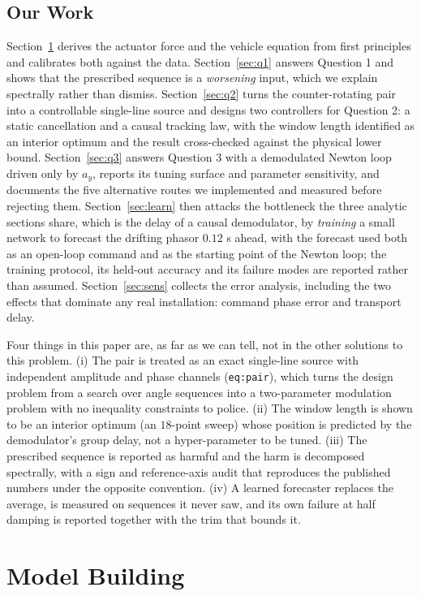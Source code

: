 \documentclass[12pt]{apmcmthesis}
\begin{document}
\subsection{Our Work}
Section~\ref{sec:model} derives the actuator force and the vehicle equation from first
principles and calibrates both against the data. Section~\ref{sec:q1} answers Question 1 and shows
that the prescribed sequence is a \emph{worsening} input, which we explain spectrally rather than
dismiss. Section~\ref{sec:q2} turns the counter-rotating pair into a controllable single-line
source and designs two controllers for Question 2: a static cancellation and a causal tracking
law, with the window length identified as an interior optimum and the result cross-checked against
the physical lower bound. Section~\ref{sec:q3} answers Question 3 with a demodulated Newton loop
driven only by $a_y$, reports its tuning surface and parameter sensitivity, and documents the
five alternative routes we implemented and measured before rejecting them.
Section~\ref{sec:learn} then attacks the bottleneck the three analytic sections share, which is the
delay of a causal demodulator, by \emph{training} a small network to forecast the drifting phasor
$0.12$ s ahead, with the forecast used both as an open-loop command and as the starting point of
the Newton loop; the training protocol, its held-out accuracy and its failure modes are reported
rather than assumed.
Section~\ref{sec:sens} collects the error analysis, including the two effects that dominate any
real installation: command phase error and transport delay.

Four things in this paper are, as far as we can tell, not in the other solutions to this problem.
(i) The pair is treated as an exact single-line source with independent amplitude and phase
channels (\texttt{eq:pair}), which turns the design problem from a search over angle sequences
into a two-parameter modulation problem with no inequality constraints to police.
(ii) The window length is shown to be an interior optimum (an $18$-point sweep) whose position is
predicted by the demodulator's group delay, not a hyper-parameter to be tuned.
(iii) The prescribed sequence is reported as harmful and the harm is decomposed spectrally, with a
sign and reference-axis audit that reproduces the published numbers under the opposite convention.
(iv) A learned forecaster replaces the average, is measured on sequences it never saw, and its own
failure at half damping is reported together with the trim that bounds it.

\section{Model Building}
\label{sec:model}
\end{document}
